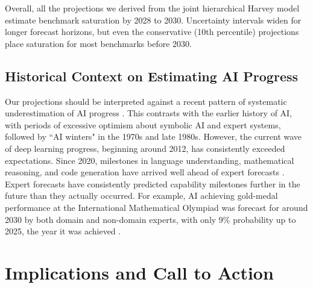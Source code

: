 \documentclass[letterpaper,twocolumn]{article}
\begin{document}
Overall, all the projections we derived from the joint hierarchical Harvey model estimate benchmark saturation by 2028 to 2030. Uncertainty intervals widen for longer forecast horizons, but even the conservative (10th percentile) projections place saturation for most benchmarks before 2030.

\subsection{Historical Context on Estimating AI Progress}
\label{subsec:underestimation}

Our projections should be interpreted against a recent pattern of systematic underestimation of AI progress \citep{kucinskas_assessing_2025}. This contrasts with the earlier history of AI, with periods of excessive optimism about symbolic AI and expert systems, followed by ``AI winters" in the 1970s and late 1980s. However, the current wave of deep learning progress, beginning around 2012, has consistently exceeded expectations. Since 2020, milestones in language understanding, mathematical reasoning, and code generation have arrived well ahead of expert forecasts \citep{steinhardt_ai_2022}.
Expert forecasts have consistently predicted capability milestones further in the future than they actually occurred.
For example, AI achieving gold-medal performance at the International Mathematical Olympiad was forecast for around 2030 by both domain and non-domain experts, with only 9\% probability up to 2025, the year it was achieved \citep{kucinskas_assessing_2025}.


\section{Implications and Call to Action}
\label{sec:implications}
\end{document}

